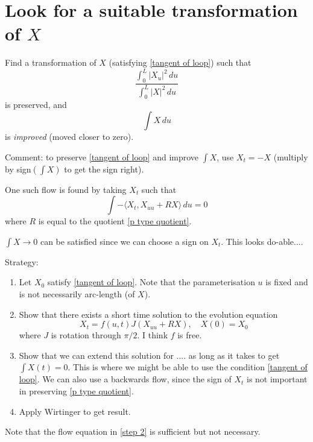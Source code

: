 \documentclass{amsart}
\begin{document}
 \section*{Look for a suitable transformation of $X$}
  
  Find a transformation of $X$ (satisfying \eqref{tangent of loop}) such that 
  \begin{equation} \label{p type quotient} \frac{\int_0^L |X_u|^2 \,du }{\int_0^L |X|^2 \,du } \end{equation}
  is preserved, and 
  $$\int X \,du$$ is \emph{improved} (moved closer to zero).
   
 
  
  Comment:   to preserve \eqref{tangent of loop} and improve $\int X$, use $X_t=-X$ (multiply by sign$(\int X)$ to get the sign right).   
  
  One such flow is found by taking $X_t$ such that 
  \[ \int -\langle X_t, X_{uu} + RX\rangle \,du =0 \]
  where $R$ is equal to the quotient \eqref{p type quotient}.   
 
 $\int X \rightarrow 0$ can be satisfied since we can choose a sign on $X_t$.     This looks do-able....
 
 Strategy:

\begin{enumerate}
\item   Let $X_0$ satisfy \eqref{tangent of loop}.   Note that the parameterisation $u$ is fixed and is not necessarily arc-length (of $X$).       
\item Show that there exists a short time solution to the evolution equation \label{step 2}
$$X_t= f(u,t) J(X_{uu}+ RX), \quad X(0)=X_0$$
where $J$ is rotation through $\pi/2$.   I think $f$ is free.  
%
% 
%
\item Show that we can extend this solution for .... as long as it takes to get $\int X(t)=0$.    This is where we might be able to use the condition \eqref{tangent of loop}.    We can also use a backwards flow, since the sign of $X_t$ is not important in preserving \eqref{p type quotient}.   
%
% 
%


\item Apply Wirtinger to get result.
\end{enumerate}
 
 Note that the flow equation in \ref{step 2} is sufficient but not necessary.    
\end{document}
